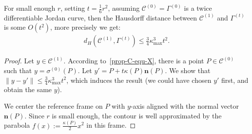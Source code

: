 \documentclass{siamart220329}
\newcommand{\C}{\mathcal{C}} %
\begin{document}
\begin{proposition}\label{prop:bcf-close-to-csf}
  For small enough $r$, setting $t = \frac{1}{6}r^2$, assuming $\C^{(0)}=\Gamma^{(0)}$ is a twice differentiable Jordan curve, then the Hausdorff distance between
  $\C^{(1)}$ and $\Gamma^{(t)}$ is some $O(t^2)$, more precisely we get:
  \begin{align*}
    d_H( \C^{(1)}, \Gamma^{(t)} ) \le \frac{3}{4} \kappa_{\max}^3 t^2.
  \end{align*}
\end{proposition}
\begin{proof}
  Let $y \in \C^{(1)}$. According to~\cref{prop-C-equ-X},
  there is a point $P \in \C^{(0)}$ such that
  $y=\sigma^{(0)}(P)$. Let $y'=P+t\kappa(P)\mathbf{n}(P)$. We
  show that $\| y-y' \| \le \frac{3}{4} \kappa_{\max}^3 t^2$,
  which induces the result (we could have chosen $y'$ first, and
  obtain the same $y$).

  We center the reference frame on $P$ with $y$-axis aligned with the
  normal vector $\mathbf{n}(P)$.  Since $r$ is small enough, the
  contour is well approximated by the parabola $f(x) :=
  \frac{\kappa(P)}{2}x^2$ in this frame.


\end{proof}
\end{document}
